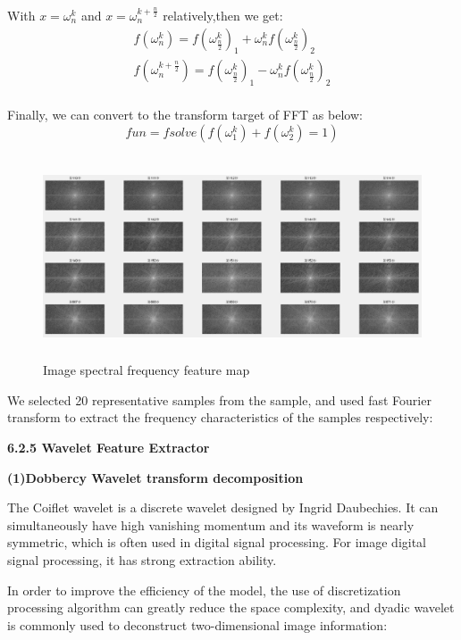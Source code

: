 \documentclass{apmcmthesis}
\begin{document}
With $x = \omega_{n}^{k}$ and $x = \omega_{n}^{k+\frac{n}{2}}$ relatively,then we get:
\begin{equation}
	\tag{6-2-7}
	\begin{split}	
		f( \omega_{n}^{k}) = f(\omega_{\frac{n}{2}}^{k})_{1}+\omega_{n}^{k}f(\omega_{\frac{n}{2}}^{k})_{2} \\
		f( \omega_{n}^{k+\frac{n}{2}}) =
	f(\omega_{\frac{n}{2}}^{k})_{1}-\omega_{n}^{k}f(\omega_{\frac{n}{2}}^{k})_{2} \\
	\end{split}
\end{equation}

Finally, we can convert to the transform target of FFT as below:
\begin{equation}
	\tag{6-2-8}
	fun = fsolve ( f(\omega_{1}^{k})+f(\omega_{2}^{k})  = 1)
\end{equation}
	\begin{figure}[htbp!]
	\centering
	\includegraphics[height=6cm]{./figures/6-2-fre.png}
	\caption{Image spectral frequency feature map}
	\label{fig:9}
\end{figure}	

We selected 20 representative samples from the sample, and used fast Fourier transform to extract the frequency characteristics of the samples respectively:


\noindent\textbf{6.2.5 Wavelet  Feature Extractor}	

\noindent\textbf{(1)Dobbercy Wavelet transform decomposition}

The Coiflet wavelet is a discrete wavelet designed by Ingrid Daubechies. It can simultaneously have high vanishing momentum and its waveform is nearly symmetric, which is often used in digital signal processing. For image digital signal processing, it has strong extraction ability.

In order to improve the efficiency of the model, the use of discretization processing algorithm can greatly reduce the space complexity, and dyadic wavelet is commonly used to deconstruct two-dimensional image information:
\end{document}
